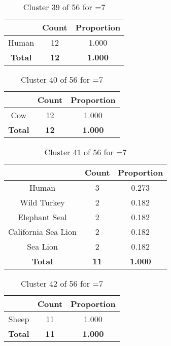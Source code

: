 \begin{table}[ht!]
\centering
\begin{tabular}{|c|c|c|}
\hline
\bf \Spec{} &\bf Count &\bf Proportion\\ \hline \hline
Human & 12 & 1.000\\ \hline
\hline
\bf Total & \bf 12 & \bf 1.000\\ \hline
\end{tabular}
\label{tab:cluster:39:7}
\caption{Cluster 39 of 56 for \minneigh{}=7}
\end{table}

\clearpage
\begin{table}[ht!]
\centering
\begin{tabular}{|c|c|c|}
\hline
\bf \Spec{} &\bf Count &\bf Proportion\\ \hline \hline
Cow & 12 & 1.000\\ \hline
\hline
\bf Total & \bf 12 & \bf 1.000\\ \hline
\end{tabular}
\label{tab:cluster:40:7}
\caption{Cluster 40 of 56 for \minneigh{}=7}
\end{table}

\begin{table}[ht!]
\centering
\begin{tabular}{|c|c|c|}
\hline
\bf \Spec{} &\bf Count &\bf Proportion\\ \hline \hline
Human & 3 & 0.273\\ \hline
Wild Turkey & 2 & 0.182\\ \hline
Elephant Seal & 2 & 0.182\\ \hline
California Sea Lion & 2 & 0.182\\ \hline
Sea Lion & 2 & 0.182\\ \hline
\hline
\bf Total & \bf 11 & \bf 1.000\\ \hline
\end{tabular}
\label{tab:cluster:41:7}
\caption{Cluster 41 of 56 for \minneigh{}=7}
\end{table}

\begin{table}[ht!]
\centering
\begin{tabular}{|c|c|c|}
\hline
\bf \Spec{} &\bf Count &\bf Proportion\\ \hline \hline
Sheep & 11 & 1.000\\ \hline
\hline
\bf Total & \bf 11 & \bf 1.000\\ \hline
\end{tabular}
\label{tab:cluster:42:7}
\caption{Cluster 42 of 56 for \minneigh{}=7}
\end{table}

